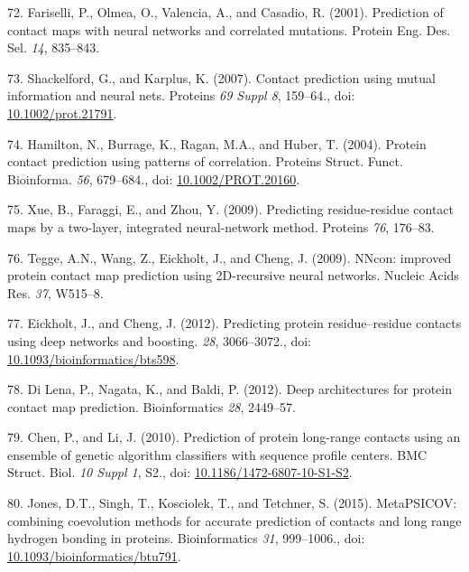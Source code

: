 \documentclass[11pt,a4paper,twoside]{book}
\theoremstyle{definition}
\theoremstyle{definition}
\theoremstyle{remark}
\begin{document}
\hypertarget{ref-Fariselli2001a}{}
72. Fariselli, P., Olmea, O., Valencia, A., and Casadio, R. (2001).
Prediction of contact maps with neural networks and correlated
mutations. Protein Eng. Des. Sel. \emph{14}, 835--843.

\hypertarget{ref-Shackelford2007}{}
73. Shackelford, G., and Karplus, K. (2007). Contact prediction using
mutual information and neural nets. Proteins \emph{69 Suppl 8},
159--64., doi:
\href{https://doi.org/10.1002/prot.21791}{10.1002/prot.21791}.

\hypertarget{ref-Hamilton2004a}{}
74. Hamilton, N., Burrage, K., Ragan, M.A., and Huber, T. (2004).
Protein contact prediction using patterns of correlation. Proteins
Struct. Funct. Bioinforma. \emph{56}, 679--684., doi:
\href{https://doi.org/10.1002/PROT.20160}{10.1002/PROT.20160}.

\hypertarget{ref-Xue2009a}{}
75. Xue, B., Faraggi, E., and Zhou, Y. (2009). Predicting
residue-residue contact maps by a two-layer, integrated neural-network
method. Proteins \emph{76}, 176--83.

\hypertarget{ref-Tegge2009a}{}
76. Tegge, A.N., Wang, Z., Eickholt, J., and Cheng, J. (2009). NNcon:
improved protein contact map prediction using 2D-recursive neural
networks. Nucleic Acids Res. \emph{37}, W515--8.

\hypertarget{ref-Eickholt2012}{}
77. Eickholt, J., and Cheng, J. (2012). Predicting protein
residue--residue contacts using deep networks and boosting. \emph{28},
3066--3072., doi:
\href{https://doi.org/10.1093/bioinformatics/bts598}{10.1093/bioinformatics/bts598}.

\hypertarget{ref-DiLena2012a}{}
78. Di Lena, P., Nagata, K., and Baldi, P. (2012). Deep architectures
for protein contact map prediction. Bioinformatics \emph{28}, 2449--57.

\hypertarget{ref-Chen2010}{}
79. Chen, P., and Li, J. (2010). Prediction of protein long-range
contacts using an ensemble of genetic algorithm classifiers with
sequence profile centers. BMC Struct. Biol. \emph{10 Suppl 1}, S2., doi:
\href{https://doi.org/10.1186/1472-6807-10-S1-S2}{10.1186/1472-6807-10-S1-S2}.

\hypertarget{ref-Jones2015}{}
80. Jones, D.T., Singh, T., Kosciolek, T., and Tetchner, S. (2015).
MetaPSICOV: combining coevolution methods for accurate prediction of
contacts and long range hydrogen bonding in proteins. Bioinformatics
\emph{31}, 999--1006., doi:
\href{https://doi.org/10.1093/bioinformatics/btu791}{10.1093/bioinformatics/btu791}.
\end{document}
